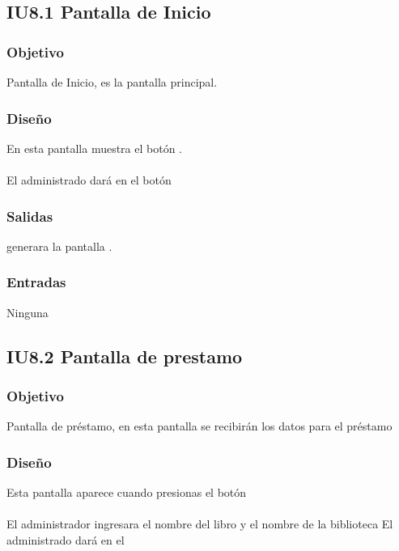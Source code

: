 \newpage
\subsection{IU8.1 Pantalla de Inicio}

\subsubsection{Objetivo}
	Pantalla de Inicio, es la pantalla principal.  

\subsubsection{Diseño}
	En esta pantalla muestra el botón .  \\\\
	El administrado dará en el botón 


\subsubsection{Salidas}
	\begin{Citemize}
		\item generara la pantalla . 
	\end{Citemize}
	
\subsubsection{Entradas}
	\begin{Citemize}
		\item Ninguna
	\end{Citemize}




\subsection{IU8.2 Pantalla de prestamo}

\subsubsection{Objetivo}
	Pantalla de préstamo, en esta pantalla se recibirán los datos para el préstamo

\subsubsection{Diseño}
	Esta pantalla aparece cuando presionas el botón   \\\\
	El administrador ingresara el nombre del libro y el nombre de la biblioteca
	El administrado dará en el 


